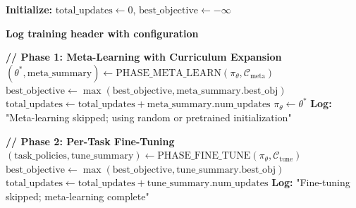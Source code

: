 \documentclass[11pt,a4paper]{article}
\begin{document}
\begin{algorithm}[h]
\caption{MetaTrainer: Complete Two-Phase Training Pipeline}
\label{alg:metatrainer}
\begin{algorithmic}[1]



\State \textbf{Initialize:} $\text{total\_updates} \leftarrow 0$, $\text{best\_objective} \leftarrow -\infty$

\State \textbf{Log training header with configuration}

\State \textbf{// Phase 1: Meta-Learning with Curriculum Expansion}
	\State $(\theta^*, \text{meta\_summary}) \leftarrow \text{PHASE\_META\_LEARN}(\pi_\theta, \mathcal{C}_{\text{meta}})$
	\State $\text{best\_objective} \leftarrow \max(\text{best\_objective}, \text{meta\_summary.best\_obj})$
	\State $\text{total\_updates} \leftarrow \text{total\_updates} + \text{meta\_summary.num\_updates}$
	\State $\pi_\theta \leftarrow \theta^*$ 
\Else
	\State \textbf{Log:} "Meta-learning skipped; using random or pretrained initialization"
\EndIf

\State \textbf{// Phase 2: Per-Task Fine-Tuning}
	\State $(\text{task\_policies}, \text{tune\_summary}) \leftarrow \text{PHASE\_FINE\_TUNE}(\pi_\theta, \mathcal{C}_{\text{tune}})$
	\State $\text{best\_objective} \leftarrow \max(\text{best\_objective}, \text{tune\_summary.best\_obj})$
	\State $\text{total\_updates} \leftarrow \text{total\_updates} + \text{tune\_summary.num\_updates}$
\Else
	\State \textbf{Log:} "Fine-tuning skipped; meta-learning complete"
\EndIf


\end{algorithmic}
\end{algorithm}
\end{document}
